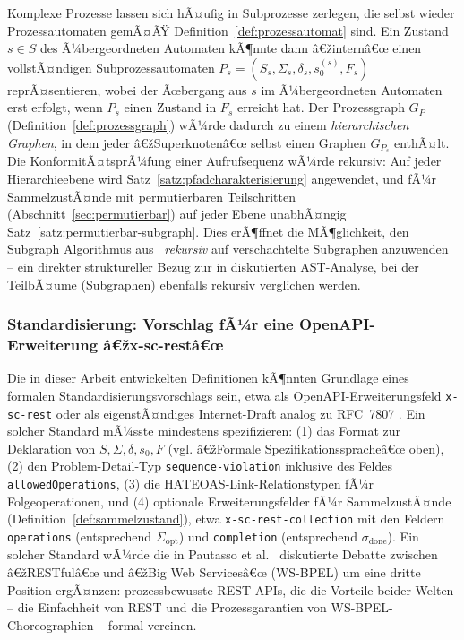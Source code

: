 ﻿\documentclass[a4paper,12pt]{article}
\theoremstyle{definition}
\begin{document}
Komplexe Prozesse lassen sich hÃ¤ufig in Subprozesse zerlegen, die selbst wieder
Prozessautomaten gemÃ¤ÃŸ Definition~\ref{def:prozessautomat} sind. Ein Zustand $s\in S$ des
Ã¼bergeordneten Automaten kÃ¶nnte dann â€žinternâ€œ einen vollstÃ¤ndigen Subprozessautomaten
$P_s=(S_s,\Sigma_s,\delta_s,s_0^{(s)},F_s)$ reprÃ¤sentieren, wobei der Ãœbergang aus $s$ im
Ã¼bergeordneten Automaten erst erfolgt, wenn $P_s$ einen Zustand in $F_s$ erreicht hat. Der
Prozessgraph $G_P$ (Definition~\ref{def:prozessgraph}) wÃ¼rde dadurch zu einem
\emph{hierarchischen Graphen}, in dem jeder â€žSuperknotenâ€œ selbst einen Graphen $G_{P_s}$
enthÃ¤lt. Die KonformitÃ¤tsprÃ¼fung einer Aufrufsequenz wÃ¼rde rekursiv: Auf jeder
Hierarchieebene wird Satz~\ref{satz:pfadcharakterisierung} angewendet, und fÃ¼r
SammelzustÃ¤nde mit permutierbaren Teilschritten (Abschnitt~\ref{sec:permutierbar}) auf
jeder Ebene unabhÃ¤ngig Satz~\ref{satz:permutierbar-subgraph}. Dies erÃ¶ffnet die
MÃ¶glichkeit, den Subgraph Algorithmus aus~\cite{epp2026subgraph} \emph{rekursiv} auf
verschachtelte Subgraphen anzuwenden -- ein direkter struktureller Bezug zur in
\cite{epp2026subgraph} diskutierten AST-Analyse, bei der TeilbÃ¤ume (Subgraphen)
ebenfalls rekursiv verglichen werden.

\subsubsection{Standardisierung: Vorschlag fÃ¼r eine OpenAPI-Erweiterung â€žx-sc-restâ€œ}

Die in dieser Arbeit entwickelten Definitionen kÃ¶nnten Grundlage eines formalen
Standardisierungsvorschlags sein, etwa als OpenAPI-Erweiterungsfeld
\texttt{x-sc-rest} oder als eigenstÃ¤ndiges Internet-Draft analog zu RFC~7807
\cite{rfc7807}. Ein solcher Standard mÃ¼sste mindestens spezifizieren: (1) das Format zur
Deklaration von $S,\Sigma,\delta,s_0,F$ (vgl. â€žFormale Spezifikationsspracheâ€œ oben), (2)
den Problem-Detail-Typ \texttt{sequence-violation} inklusive des Feldes
\texttt{allowedOperations}, (3) die HATEOAS-Link-Relationstypen fÃ¼r Folgeoperationen, und
(4) optionale Erweiterungsfelder fÃ¼r SammelzustÃ¤nde (Definition~\ref{def:sammelzustand}),
etwa \texttt{x-sc-rest-collection} mit den Feldern \texttt{operations} (entsprechend
$\Sigma_{\mathrm{opt}}$) und \texttt{completion} (entsprechend $\sigma_{\mathrm{done}}$).
Ein solcher Standard wÃ¼rde die in Pautasso et al.~\cite{pautasso2008} diskutierte Debatte
zwischen â€žRESTfulâ€œ und â€žBig Web Servicesâ€œ (WS-BPEL) um eine dritte Position ergÃ¤nzen:
prozessbewusste REST-APIs, die die Vorteile beider Welten -- die Einfachheit von REST und
die Prozessgarantien von WS-BPEL-Choreographien -- formal vereinen.
\end{document}
